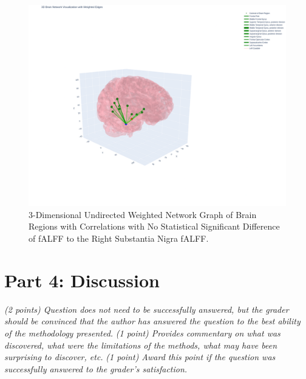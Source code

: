 \documentclass[12pt]{article}
\begin{document}
\begin{figure}[h]  %
    \centering
    \includegraphics[width=\textwidth]{"../img/3D_Plot_of_Correlated_fALFF.png"}  %
    \caption{3-Dimensional Undirected Weighted Network Graph of Brain Regions with Correlations with No Statistical Significant Difference of fALFF to the Right Substantia Nigra fALFF.}
    \label{fig:3D}  %
\end{figure}

\FloatBarrier

\newpage
\section{Part 4: Discussion}
\textit{(2 points) Question does not need to be successfully answered, but the grader should be convinced that the author has answered the question to the best ability of the methodology presented.}
\textit{(1 point) Provides commentary on what was discovered, what were the limitations of the methods, what may have been surprising to discover, etc.}
\textit{(1 point) Award this point if the question was successfully answered to the grader's satisfaction. }

\FloatBarrier

\end{document}
